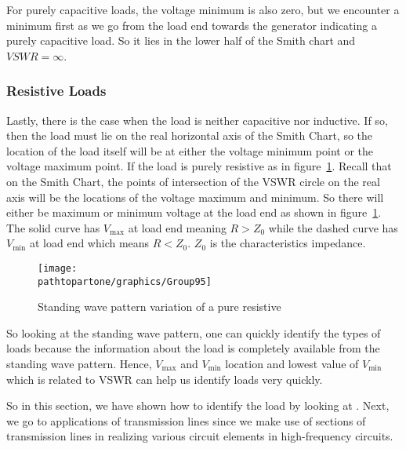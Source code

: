 For purely capacitive loads, the voltage minimum is also zero, but we encounter a minimum first as we go from the load end towards the generator indicating a purely capacitive load. So it lies in the lower half of the Smith chart and $VSWR=\infty$.

\subsubsection{Resistive Loads}
Lastly, there is the case when the load is neither capacitive nor inductive. If so, then the load must lie on the real horizontal axis of the Smith Chart, so the location of the load itself will be at either the voltage minimum point or the voltage maximum point. If the load is purely resistive as in figure~\ref{fig:group95}. Recall that on the Smith Chart, the points of intersection of the VSWR circle on the real axis will be the locations of the voltage maximum and minimum. So there will either be maximum or minimum voltage at the load end as shown in figure~\ref{fig:group95}. The solid curve has ${V_\max}$ at load end meaning ${R>Z_0}$ while the dashed curve has ${V_\min}$ at load end which means ${R<Z_0}$. ${Z_0}$ is the characteristics impedance.
\begin{figure}[h]
\centering
\texttt{[image: \\pathtopartone/graphics/Group95]}
\caption{Standing wave pattern variation of a pure resistive}
\label{fig:group95}
\end{figure}

So looking at the standing wave pattern, one can quickly identify the types of loads because the information about the load is completely available from the standing wave pattern. Hence, ${V_\max}$ and ${V_\min}$ location and lowest value of ${V_\min}$ which is related to VSWR can help us identify loads very quickly.

So in this section, we have shown how to identify the load by looking at . Next, we go to applications of transmission lines since we make use of sections of transmission lines in realizing various circuit elements in high-frequency circuits.



